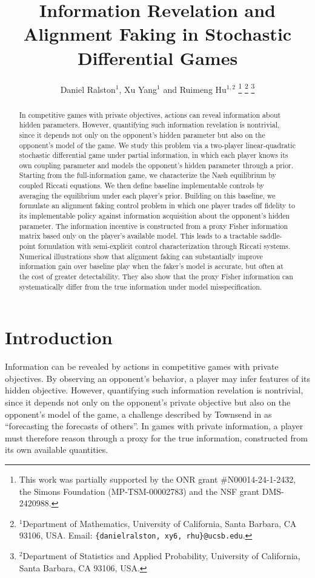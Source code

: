 \documentclass[letterpaper, 10 pt, conference]{ieeeconf}
\title{\LARGE \bf
Information Revelation and Alignment Faking in Stochastic Differential Games}
\author{Daniel Ralston$^{1}$, Xu Yang$^{1}$ and Ruimeng Hu$^{1,2}$%
\thanks{This work was partially supported by the ONR grant \#N00014-24-1-2432, the Simons Foundation (MP-TSM-00002783) and the NSF grant DMS-2420988.}%
\thanks{$^{1}$Department of Mathematics, University of California, Santa Barbara, CA 93106, USA.
Email: \texttt{\{danielralston, xy6, rhu\}@ucsb.edu}.}
\thanks{$^{2}$Department of Statistics and Applied Probability, University of California, Santa Barbara, CA 93106, USA.}
}
\begin{document}
\maketitle
\thispagestyle{empty}
\pagestyle{empty}

\begin{abstract}
In competitive games with private objectives, actions can reveal information about hidden parameters. However, quantifying such information revelation is nontrivial, since it depends not only on the opponent's hidden parameter but also on the opponent's model of the game. We study this problem via a two-player linear-quadratic stochastic differential game under partial information, in which each player knows its own coupling parameter and models the opponent’s hidden parameter through a prior. Starting from the full-information game, we characterize the Nash equilibrium by coupled Riccati equations. We then define baseline implementable controls by averaging the equilibrium under each player’s prior.  Building on this baseline, we formulate an alignment faking control problem in which one player trades off fidelity to its implementable policy against information acquisition about the opponent’s hidden parameter. The information incentive is constructed from a proxy Fisher information matrix based only on the player’s available model. This leads to a tractable saddle-point formulation with semi-explicit control characterization through Riccati systems. Numerical illustrations show that alignment faking can substantially improve information gain over baseline play when the faker’s model is accurate, but often at the cost of greater detectability. They also show that the proxy Fisher information can systematically differ from the true information under model misspecification.
\end{abstract}


\section{Introduction}
Information can be revealed by actions in competitive games with private objectives. By observing an opponent's behavior, a player may infer features of its hidden objective. However, quantifying such information revelation is nontrivial, since it depends not only on the opponent's private objective but also on the opponent's model of the game, a challenge described by Townsend in \cite{townsend1983forecasting} as ``forecasting the forecasts of others''. In games with private information, a player must therefore reason through a proxy for the true information, constructed from its own available quantities. 
\end{document}
